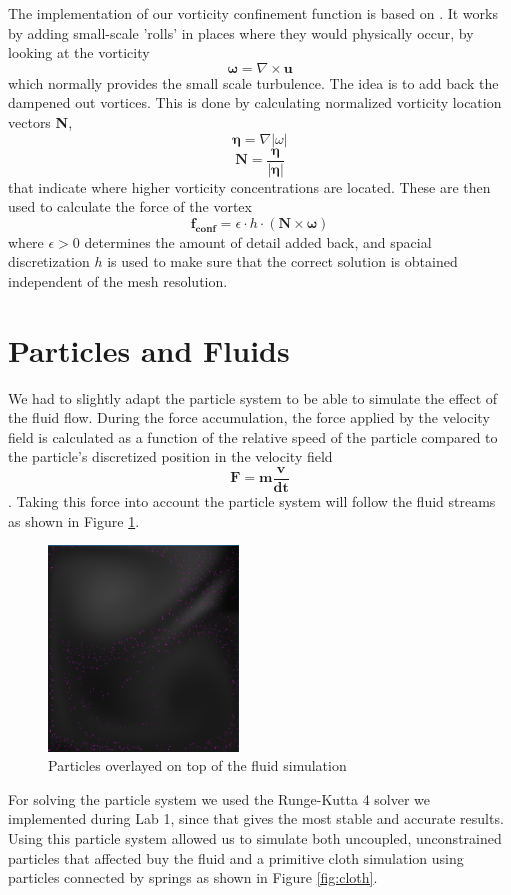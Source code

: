 \documentclass[a4paper,twoside,11pt,twocolumn]{article}
\begin{document}
The implementation of our vorticity confinement function is based on \cite{fedkiw}. It works by adding small-scale 'rolls' in places where they would physically occur, by looking at the vorticity \[ \mathbf{\omega} = \nabla \times \mathbf{u} \] which normally provides the small scale turbulence. The idea is to add back the dampened out vortices. This is done by calculating normalized vorticity location vectors \textbf{N},  \[\mathbf{\eta} = \nabla|\omega| \]\[ \mathbf{N} = \frac{\mathbf{\eta}}{|\mathbf{\eta}|} \] that indicate where higher vorticity concentrations are located. These are then used to calculate the force of the vortex \[ \mathbf{f_{conf}} = \epsilon\cdot h\cdot(\mathbf{N} \times \mathbf{\omega}) \] where $\epsilon > 0$ determines the amount of detail added back, and spacial discretization $h$ is used to make sure that the correct solution is obtained independent of the mesh resolution.

\section{Particles and Fluids}
We had to slightly adapt the particle system to be able to simulate the effect of the fluid flow. During the force accumulation, the force applied by the velocity field is calculated as a function of the relative speed of the particle compared to the particle's discretized position in the velocity field \[ \mathbf{F} = \mathbf{m\frac{v}{dt}} \]. Taking this force into account the particle system will follow the fluid streams as shown in Figure \ref{fig:particles}.

\begin{figure}[h]
	\centering
	\includegraphics[width=0.45\textwidth]{particles}
	\caption{Particles overlayed on top of the fluid simulation}
	\label{fig:particles}
\end{figure}

For solving the particle system we used the Runge-Kutta 4 solver we implemented during Lab 1, since that gives the most stable and accurate results. Using this particle system allowed us to simulate both uncoupled, unconstrained particles that affected buy the fluid and a primitive cloth simulation using particles connected by springs as shown in Figure \ref{fig:cloth}.
\end{document}

